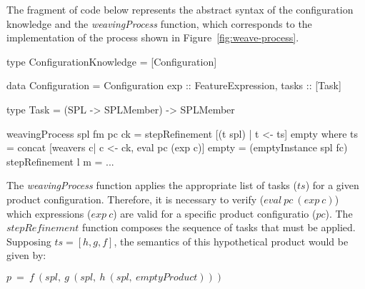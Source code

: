 \appendix

The fragment of code below represents the abstract syntax of the configuration knowledge and the \emph{weavingProcess} function, which corresponds to the implementation of the process shown in Figure~\ref{fig:weave-process}.
 
 \begin{code}
 type ConfigurationKnowledge = [Configuration]

 data Configuration = Configuration {
  exp :: FeatureExpression,
  tasks :: [Task] 	
 }

 type Task = (SPL -> SPLMember) -> SPLMember

 weavingProcess spl fm pc ck =
    stepRefinement [(t spl) | t <- ts] empty
    where
     ts = concat [weavers c| c <- ck, eval pc (exp c)]
     empty = (emptyInstance spl fc)
     stepRefinement l m = ...   	
 \end{code}
 
 The \emph{weavingProcess} function applies the appropriate list of tasks ($ts$) 
 for a given product configuration. Therefore, it is necessary to verify  ($eval\ pc\ (exp\ c)$) which expressions ($exp\ c$) are valid for a specific product configuratio ($pc$). The $stepRefinement$ function composes the sequence of tasks that must
 be applied. Supposing $ts = [h,g,f]$, the semantics of
 this hypothetical product would be given by:

 \begin{center}
 $ p\ =\ f\ (spl,\ g\ (spl,\ h\ (spl,\ emptyProduct)))  $
 \end{center}